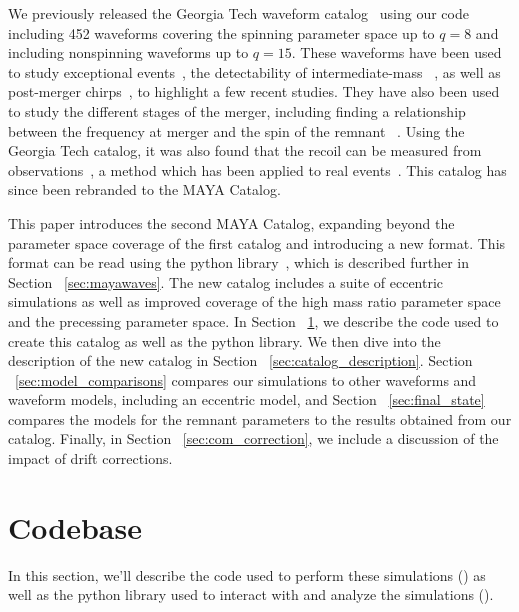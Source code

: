 \documentclass[
twocolumn,prd,
showpacs,
nofootinbib,
amsmath,amssymb,
superscriptaddress]{revtex4-1}
\begin{document}
We previously released the Georgia Tech waveform catalog~\cite{Jani:2016wkt} using our \maya{} code including 452 waveforms covering the spinning parameter space up to $q=8$ and including nonspinning waveforms up to $q=15$.
These waveforms have been used to study exceptional \lvk{} events~\cite{Lange:2017wki}, the detectability of intermediate-mass ~\cite{Jani:2019ffg, PhysRevD.102.044035, LIGOScientific:2021tfm}, as well as post-merger chirps~\cite{CalderonBustillo:2019wwe}, to highlight a few recent studies.
They have also been used to study the different stages of the merger, including finding a relationship between the frequency at merger and the spin of the remnant \bh{}~\cite{Ferguson:2019slp, Healy:2014eua}.
Using the Georgia Tech catalog, it was also found that the \bh{} recoil can be measured from \gw{} observations~\cite{PhysRevLett.121.191102}, a method which has been applied to real events~\cite{CalderonBustillo:2022ldv}.
This catalog has since been rebranded to the MAYA Catalog.%

This paper introduces the second MAYA Catalog, expanding beyond the parameter space coverage of the first catalog and introducing a new format. 
This format can be read using the \mayawaves{} python library~\cite{Ferguson:2023mks, Ferguson_mayawaves_2023},  which is described further in Section ~\ref{sec:mayawaves}.  
The new catalog includes a suite of eccentric simulations as well as improved coverage of the high mass ratio parameter space and the precessing parameter space.
In Section ~\ref{sec:codebase}, we describe the \maya{} code used to create this catalog as well as the \mayawaves{} python library.
We then dive into the description of the new catalog in Section ~\ref{sec:catalog_description}.
Section ~\ref{sec:model_comparisons} compares our simulations to other \nr{} waveforms and waveform models, including an eccentric model, and Section ~\ref{sec:final_state} compares the models for the remnant \bh{} parameters to the results obtained from our catalog. 
Finally, in Section ~\ref{sec:com_correction}, we include a discussion of the impact of \com{} drift corrections.

\section{Codebase}\label{sec:codebase}

In this section, we'll describe the code used to perform these \nr{} simulations (\maya{}) as well as the python library used to interact with and analyze the simulations (\mayawaves{}).
\end{document}
